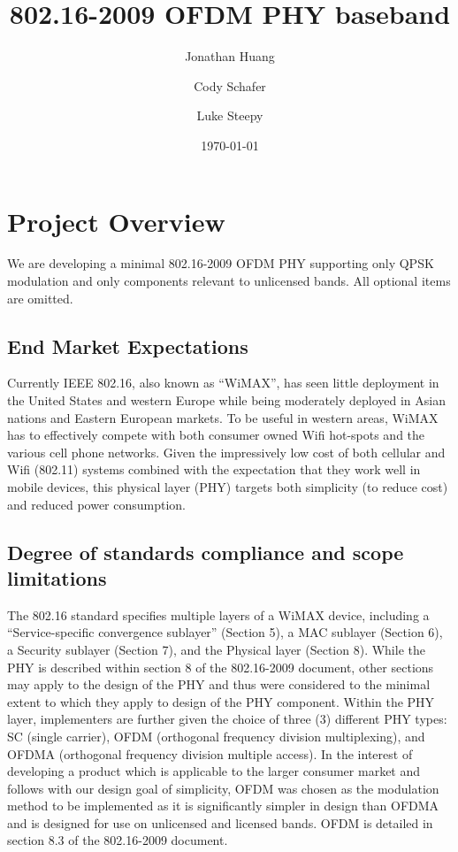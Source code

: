 \documentclass[10pt]{article}
\title{802.16-2009 OFDM PHY baseband}
\author{Jonathan Huang \and Cody Schafer \and Luke Steepy}
\date{\today}
\begin{document}
\maketitle
\section{Project Overview}
We are developing a minimal 802.16-2009 OFDM PHY supporting only QPSK
modulation and only components relevant to unlicensed bands. All
optional items are omitted.

	\subsection{End Market Expectations}
	Currently IEEE 802.16, also known as ``WiMAX'', has seen little deployment in the
	United States and western Europe while being moderately deployed in Asian
	nations and Eastern European markets. To be useful in western areas, WiMAX has
	to effectively compete with both consumer owned Wifi hot-spots and the various
	cell phone networks. Given the impressively low cost of both cellular and Wifi
	(802.11) systems combined with the expectation that they work well in mobile
	devices, this physical layer (PHY) targets both simplicity (to reduce cost) and
	reduced power consumption.

	\subsection{Degree of standards compliance and scope limitations}
	The 802.16 standard specifies multiple layers of a WiMAX device, including a
	``Service-specific convergence sublayer'' (Section 5), a MAC sublayer (Section
	6), a Security sublayer (Section 7), and the Physical layer (Section 8). While
	the PHY is described within section 8 of the 802.16-2009 document, other
	sections may apply to the design of the PHY and thus were considered to the
	minimal extent to which they apply to design of the PHY component.  Within the
	PHY layer, implementers are further given the choice of three (3) different PHY
	types: SC (single carrier), OFDM (orthogonal frequency division multiplexing),
	and OFDMA (orthogonal frequency division multiple access). In the interest of
	developing a product which is applicable to the larger consumer market and
	follows with our design goal of simplicity, OFDM was chosen as the modulation
	method to be implemented as it is significantly simpler in design than OFDMA
	and is designed for use on unlicensed and licensed bands. OFDM is detailed in
	section 8.3 of the 802.16-2009 document.
\end{document}
